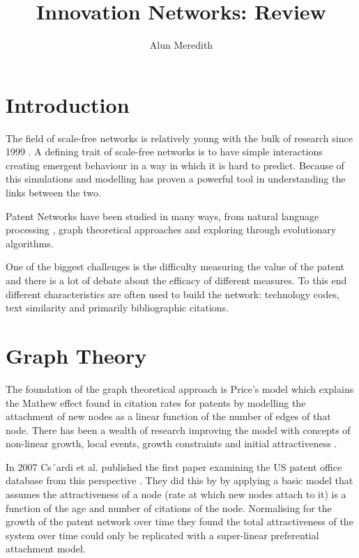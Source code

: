 \documentclass[12pt,journal,compsoc]{IEEEtran}
\begin{document}
\title{Innovation Networks: Review}
\author{Alun Meredith}
\maketitle

\section{Introduction}
The field of scale-free networks is relatively young with the bulk of research since 1999 \cite{barabasi1999emergence}. A defining trait of scale-free networks is to have simple interactions creating emergent behaviour in a way in which it is hard to predict. Because of this simulations and modelling has proven a powerful tool in understanding the links between the two. 

Patent Networks have been studied in many ways, from natural language processing \cite{abbas2014literature}, graph theoretical approaches and exploring through evolutionary algorithms. 

One of the biggest challenges is the difficulty measuring the value of the patent and there is a lot of debate about the efficacy of different measures. To this end different characteristics are often used to build the network: technology codes, text similarity and primarily bibliographic citations. 


\section{Graph Theory}
The foundation of the graph theoretical approach is Price's model which  \cite{price1976general}explains the Mathew effect found in citation rates for patents \cite{merton1968matthew} by modelling the attachment of new nodes as a linear function of the number of edges of that node. There has been a wealth of research improving the model with concepts of non-linear growth, local events, growth constraints and initial attractiveness \cite{albert2002statistical}.  

In 2007 Cs´ardi et al. published the first paper examining the US patent office database from this perspective \cite{csardi2007modeling}. They did this by by applying a basic model that assumes the attractiveness of a node (rate at which new nodes attach to it) is a function of the age and number of citations of the node. Normalising for the growth of the patent network over time they found the total attractiveness of the system over time could only be replicated with a super-linear preferential attachment model. 
\end{document}
